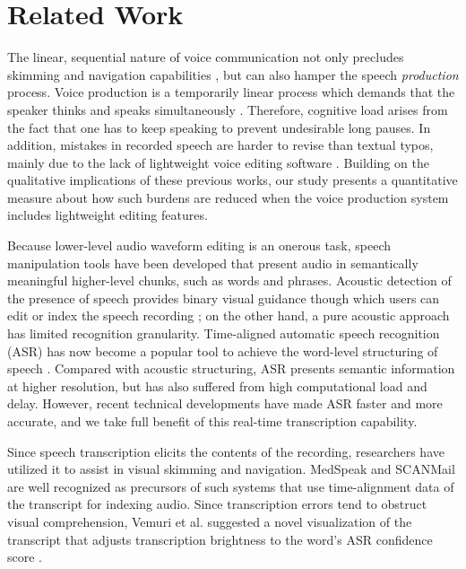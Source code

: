 \section{Related Work}

The linear, sequential nature of voice communication not only precludes skimming and navigation capabilities \cite{grudin}, but can also hamper the speech \emph{production} process. 
Voice production is a temporarily linear process which demands that the speaker thinks and speaks simultaneously \cite{marriott2002, yoon:2015}.
Therefore, cognitive load arises from the fact that one has to keep speaking to prevent undesirable long pauses. 
In addition, mistakes in recorded speech are harder to revise than textual typos, mainly due to the lack of lightweight voice editing software \cite{marriott2002}.  
Building on the qualitative implications of these previous works, our study presents a quantitative measure about how such burdens are reduced when the voice production system includes lightweight editing features.

Because lower-level audio waveform editing is an onerous task, speech manipulation tools have been developed that present audio in semantically meaningful higher-level chunks, such as words and phrases.
Acoustic detection of the presence of speech provides binary visual guidance though which users can edit or index the speech recording \cite{ades1986, hindus:1992}; on the other hand, a pure acoustic approach has limited recognition granularity.
Time-aligned automatic speech recognition (ASR) has now become a popular tool to achieve the word-level structuring of speech \cite{Schmandt81, Wilcox:1992}. 
Compared with acoustic structuring, ASR presents semantic information at higher resolution, but has also suffered from high computational load and delay. 
However, recent technical developments have made ASR faster and more accurate, and we take full benefit of this real-time transcription capability.

Since speech transcription elicits the contents of the recording, researchers have utilized it to assist in visual skimming and navigation. 
MedSpeak \cite{Lai:1997} and SCANMail \cite{whittaker} are well recognized as precursors of such systems that use time-alignment data of the transcript for indexing audio. 
Since transcription errors tend to obstruct visual comprehension, Vemuri et al. suggested a novel visualization of the transcript that adjusts transcription brightness to the word's ASR confidence score \cite{Vemuri:2004}. 

